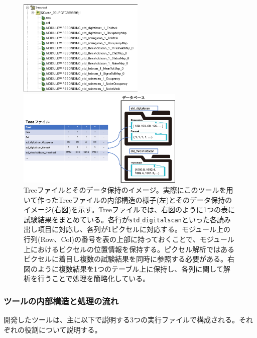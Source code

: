 \begin{figure}[bpt]
  \begin{minipage}{0.4\hsize}
    \begin{center}
    \includegraphics[width=6cm]{./analysis_tool_tree_file.png}
    \end{center}
  \end{minipage}
  \begin{minipage}{0.4\hsize}
    \begin{center}
    \includegraphics[width=8cm]{./analysis_tool_tree_image.png}
    \end{center}
  \end{minipage}
  \caption[Treeファイルとそのデータ保持のイメージ]{Treeファイルとそのデータ保持のイメージ。実際にこのツールを用いて作ったTreeファイルの内部構造の様子(左)とそのデータ保持のイメージ(右図)を示す。Treeファイルでは、右図のように1つの表に試験結果をまとめている。各行が\texttt{std$\_$digitalscan}といった各読み出し項目に対応し、各列が1ピクセルに対応する。モジュール上の行列(Row、Col)の番号を表の上部に持っておくことで、モジュール上におけるピクセルの位置情報を保持する。ピクセル解析ではあるピクセルに着目し複数の試験結果を同時に参照する必要がある。右図のように複数結果を1つのテーブル上に保持し、各列に関して解析を行うことで処理を簡略化している。}
  \label{analysis_tool_tree}
\end{figure}

\subsubsection{ツールの内部構造と処理の流れ}
開発したツールは、主に以下で説明する3つの実行ファイルで構成される。それぞれの役割について説明する。

